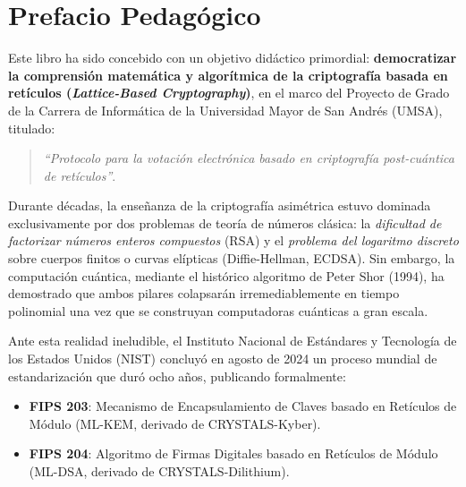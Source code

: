 \documentclass[11pt,a4paper,twoside,openright]{book}
\theoremstyle{plain}
\theoremstyle{definition}
\theoremstyle{remark}
\newcommand{\MLKEM}{\textsf{ML-KEM}}
\newcommand{\MLDSA}{\textsf{ML-DSA}}
\begin{document}
\hypersetup{pageanchor=true}

\frontmatter
\tableofcontents
\listoffigures
\listoftables

\chapter*{Prefacio Pedag\'ogico}

Este libro ha sido concebido con un objetivo did\'actico primordial: \textbf{democratizar la comprensi\'on matem\'atica y algor\'itmica de la criptograf\'ia basada en ret\'iculos (\emph{Lattice-Based Cryptography})}, en el marco del Proyecto de Grado de la Carrera de Inform\'atica de la Universidad Mayor de San Andr\'es (UMSA), titulado:

\begin{quote}
\textit{``Protocolo para la votaci\'on electr\'onica basado en criptograf\'ia post-cu\'antica de ret\'iculos''}.
\end{quote}

Durante d\'ecadas, la ense\~nanza de la criptograf\'ia asim\'etrica estuvo dominada exclusivamente por dos problemas de teor\'ia de n\'umeros cl\'asica: la \emph{dificultad de factorizar n\'umeros enteros compuestos} (RSA) y el \emph{problema del logaritmo discreto} sobre cuerpos finitos o curvas el\'ipticas (Diffie-Hellman, ECDSA). Sin embargo, la computaci\'on cu\'antica, mediante el hist\'orico algoritmo de Peter Shor (1994), ha demostrado que ambos pilares colapsar\'an irremediablemente en tiempo polinomial una vez que se construyan computadoras cu\'anticas a gran escala.

Ante esta realidad ineludible, el Instituto Nacional de Est\'andares y Tecnolog\'ia de los Estados Unidos (NIST) concluy\'o en agosto de 2024 un proceso mundial de estandarizaci\'on que dur\'o ocho a\~nos, publicando formalmente:
\begin{itemize}
  \item \textbf{FIPS 203}: Mecanismo de Encapsulamiento de Claves basado en Ret\'iculos de M\'odulo (\MLKEM{}, derivado de CRYSTALS-Kyber).
  \item \textbf{FIPS 204}: Algoritmo de Firmas Digitales basado en Ret\'iculos de M\'odulo (\MLDSA{}, derivado de CRYSTALS-Dilithium).
\end{itemize}
\end{document}
